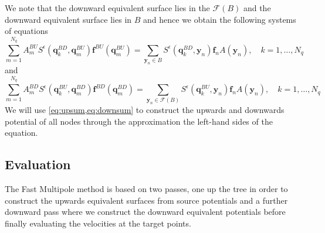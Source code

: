 We note that the downward equivalent surface lies in the $\mathcal{F}(B)$ and the downward equivalent surface lies in $B$ and hence we obtain the following systems of equations
\begin{equation}
\label{eq:upsum}
    \sum_{m=1}^{N_{q}} A_{m}^{BU} S^\epsilon\left(\bm{q}^{BD}_{k}, \bm{q}_{m}^{B U}\right) \bm{f}^{B U}\left(\bm{q}_{m}^{B U}\right)=\sum_{{\bm{y}}_{n} \in B} S^\epsilon\left(\bm{q}^{BD}_{k}, {\bm{y}}_{n}\right) {\bm{f}}_{n} A({\bm{y}}_n), \quad k=1,\dots,N_q
\end{equation}
and
\begin{equation}
\label{eq:downsum}
    \sum_{m=1}^{N_{q}} A_{m}^{BD} S^\epsilon\left(\bm{q}^{BU}_{k}, \bm{q}_{m}^{B D}\right) \bm{f}^{B D}\left(\bm{q}_{m}^{B D}\right)=\sum_{{\bm{y}}_{n} \in \mathcal{F}(B)} S^\epsilon\left(\bm{q}^{BU}_{k}, {\bm{y}}_{n}\right) {\bm{f}}_{n} A({\bm{y}}_n), \quad k=1,\dots,N_q
\end{equation}
We will use \cref{eq:upsum,eq:downsum} to construct the upwards and downwards potential of all nodes through the approximation the left-hand sides of the equation. 

\subsection{Evaluation}
The Fast Multipole method is based on two passes, one up the tree in order to construct the upwards equivalent surfaces from source potentials and a further downward pass where we construct the downward equivalent potentials before finally evaluating the velocities at the target points. 

